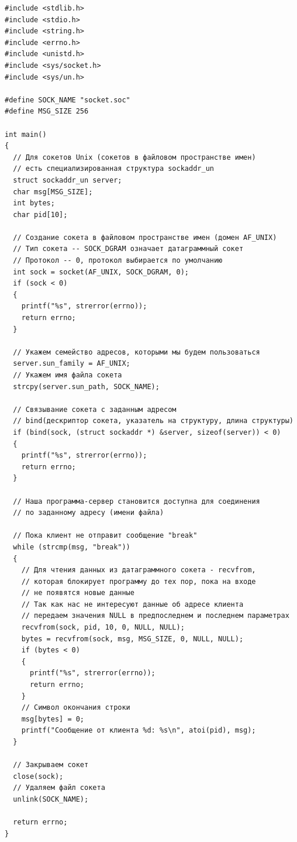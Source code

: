 \documentclass[a4paper,14pt]{extreport} %
\begin{document}
\begin{lstlisting}[caption=Код сервера]
#include <stdlib.h>
#include <stdio.h>
#include <string.h>
#include <errno.h>
#include <unistd.h>
#include <sys/socket.h>
#include <sys/un.h>

#define SOCK_NAME "socket.soc"
#define MSG_SIZE 256

int main()
{
  // Для сокетов Unix (сокетов в файловом пространстве имен)
  // есть специализированная структура sockaddr_un
  struct sockaddr_un server;
  char msg[MSG_SIZE];
  int bytes;
  char pid[10];

  // Создание сокета в файловом пространстве имен (домен AF_UNIX)
  // Тип сокета -- SOCK_DGRAM означает датаграммный сокет
  // Протокол -- 0, протокол выбирается по умолчанию
  int sock = socket(AF_UNIX, SOCK_DGRAM, 0);
  if (sock < 0)
  {
    printf("%s", strerror(errno));
    return errno;
  }

  // Укажем семейство адресов, которыми мы будем пользоваться
  server.sun_family = AF_UNIX;
  // Укажем имя файла сокета
  strcpy(server.sun_path, SOCK_NAME);

  // Связывание сокета с заданным адресом
  // bind(дескриптор сокета, указатель на структуру, длина структуры)
  if (bind(sock, (struct sockaddr *) &server, sizeof(server)) < 0)
  {
    printf("%s", strerror(errno));
    return errno;
  }

  // Наша программа-сервер становится доступна для соединения
  // по заданному адресу (имени файла)

  // Пока клиент не отправит сообщение "break"
  while (strcmp(msg, "break"))
  {
    // Для чтения данных из датаграммного сокета - recvfrom,
    // которая блокирует программу до тех пор, пока на входе 
    // не появятся новые данные
    // Так как нас не интересуют данные об адресе клиента
    // передаем значения NULL в предпоследнем и последнем параметрах
    recvfrom(sock, pid, 10, 0, NULL, NULL);
    bytes = recvfrom(sock, msg, MSG_SIZE, 0, NULL, NULL);
    if (bytes < 0)
    {
      printf("%s", strerror(errno));
      return errno;
    }
    // Символ окончания строки
    msg[bytes] = 0;
    printf("Сообщение от клиента %d: %s\n", atoi(pid), msg);
  }

  // Закрываем сокет
  close(sock);
  // Удаляем файл сокета
  unlink(SOCK_NAME);

  return errno;
}
\end{lstlisting}
\end{document}
